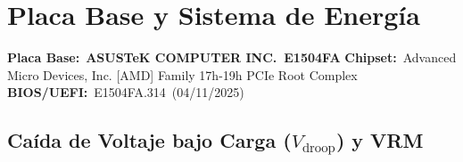 \documentclass[11pt, a4paper, final]{article}
\newcommand{\mv}[1]{\textcolor{AMPrimary}{\textbf{#1}}}
\begin{document}
\newpage


\section{Placa Base y Sistema de Energía}

\begin{componentinfo}
  \small
  \textbf{Placa Base:}\ \mv{ASUSTeK COMPUTER INC.\ E1504FA}\hfill
  \textbf{Chipset:}\ Advanced Micro Devices, Inc. [AMD] Family 17h-19h PCIe Root Complex\hfill
  \textbf{BIOS/UEFI:}\ E1504FA.314\ (04/11/2025)
\end{componentinfo}

\vspace{0.5cm}


\subsection{Caída de Voltaje bajo Carga ($V_{\mathrm{droop}}$) y VRM}
\end{document}
